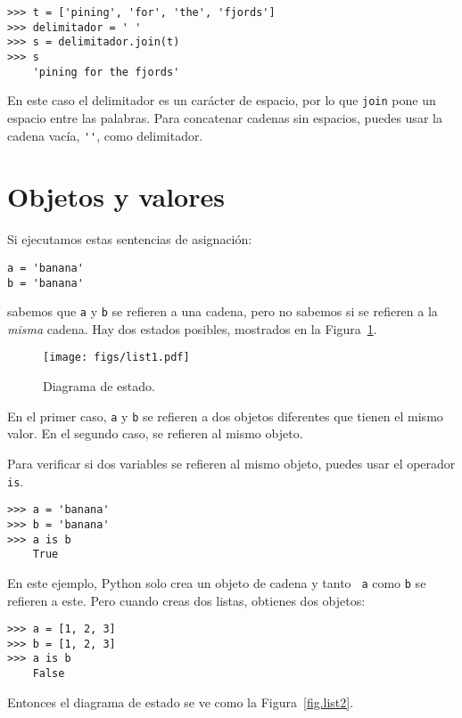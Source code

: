 \documentclass[10pt]{book}
\begin{document}
\begin{verbatim}
>>> t = ['pining', 'for', 'the', 'fjords']
>>> delimitador = ' '
>>> s = delimitador.join(t)
>>> s
    'pining for the fjords'
\end{verbatim}
%
En este caso el delimitador es un carácter de espacio, por lo que
{\tt join} pone un espacio entre las palabras.  Para concatenar
cadenas sin espacios, puedes usar la cadena vacía,
\verb"''", como delimitador.


\section{Objetos y valores}
\label{equivalence}

Si ejecutamos estas sentencias de asignación:

\begin{verbatim}
a = 'banana'
b = 'banana'
\end{verbatim}
%
sabemos que {\tt a} y {\tt b} se refieren a una
cadena, pero no
sabemos si se refieren a la {\em misma} cadena.
Hay dos estados posibles, mostrados en la Figura~\ref{fig.list1}.

\begin{figure}
\centerline
{\texttt{[image: figs/list1.pdf]}}
\caption{Diagrama de estado.}
\label{fig.list1}
\end{figure}

En el primer caso, {\tt a} y {\tt b} se refieren a dos objetos diferentes que
tienen el mismo valor.  En el segundo caso, se refieren al mismo
objeto.

Para verificar si dos variables se refieren al mismo objeto, puedes
usar el operador {\tt is}.

\begin{verbatim}
>>> a = 'banana'
>>> b = 'banana'
>>> a is b
    True
\end{verbatim}
%
En este ejemplo, Python solo crea un objeto de cadena y tanto {\tt
  a} como {\tt b} se refieren a este.  Pero cuando creas dos listas, obtienes
dos objetos:

\begin{verbatim}
>>> a = [1, 2, 3]
>>> b = [1, 2, 3]
>>> a is b
    False
\end{verbatim}
%
Entonces el diagrama de estado se ve como la Figura~\ref{fig.list2}.
\end{document}
